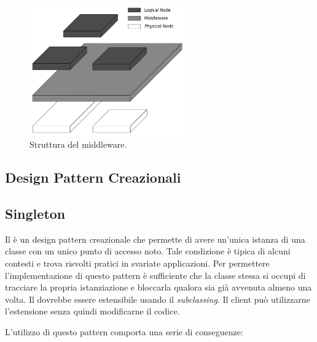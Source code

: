 \begin{figure}[h]
\centering \includegraphics[width=0.6\textwidth]{patterns/Middleware.png}
\caption{Struttura del middleware.}
\end{figure}

\subsection{Design Pattern Creazionali}

\subsection{Singleton}

Il  è un design pattern creazionale che permette di avere un'unica istanza di una classe con un unico punto di accesso noto. Tale condizione è tipica di alcuni contesti e trova risvolti pratici in svariate applicazioni. Per permettere l'implementazione di questo pattern è sufficiente che la classe stessa si occupi di tracciare la propria istanziazione e bloccarla qualora sia già avvenuta almeno una volta. Il  dovrebbe essere estensibile usando il \emph{subclassing}. Il client può utilizzarne l'estensione senza quindi modificarne il codice.
	
L'utilizzo di questo pattern comporta una serie di conseguenze:

